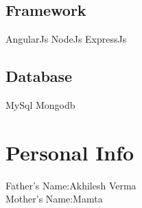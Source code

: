 \documentclass[]{resume}
\begin{document}
\begin{minipage}[t]{0.33\textwidth}
\subsection{Framework}
AngularJs \textbullet{} NodeJs \textbullet{} ExpressJs \textbullet{}
\subsection{Database}
MySql \textbullet{} Mongodb \textbullet{} 
\sectionsep

\section{Personal Info}
Father's Name:Akhilesh Verma\\
Mother's Name:Mamta\\

%
%

\end{minipage} 
\hfill
\end{document}
